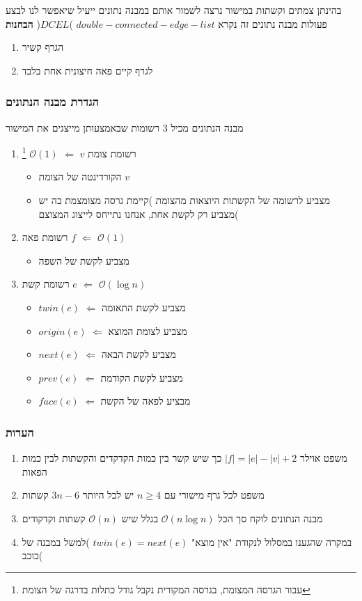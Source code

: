 \documentclass{article}
\makeatletter
\newcommand*{\saved@uline}{}
\let\saved@uline\uline
\newcommand*{\mathuline}{%
  \mathpalette{\math@uline\saved@uline}%
}
\newcommand*{\math@uline}[3]{%
  \mbox{#1{$#2#3\m@th$}}%
}
\renewcommand*{\uline}{%
  \relax  
  \ifmmode
    \expandafter\mathuline
  \else
    \expandafter\saved@uline
  \fi
}
\makeatother
\begin{document}
\noindent בהינתן צמתים וקשתות במישור נרצה לשמור אותם במבנה נתונים ייעיל שיאפשר לנו לבצע  פעולות מבנה נתונים זה נקרא $double-connected-edge-list$ )$DCEL$( 
\newline\noindent\textbf{הבחנות}
\begin{enumerate}
\item הגרף קשיר
\item לגרף קיים פאה חיצונית אחת בלבד
\end{enumerate}
\subsubsection{הגדרת מבנה הנתונים}
\noindent מבנה הנתונים מכיל 3 רשומות שבאמצעותן מייצגים את המישור
\begin{enumerate}
\item \uline{רשומת צומת $v$} $\Leftarrow$ $\mathcal{O}{(1)}$ \footnote{עבור הגרסה המצומת, בגרסה המקורית נקבל גודל כתלות בדרגה של הצומת}
\begin{itemize}
\item הקורדינטה של הצומת $v$
\item מצביע לרשומה של הקשתות היוצאות מהצומת )קיימת גרסה מצומצמת בה יש מצביע רק לקשת אחת, אנחנו נתייחס לייצוג המצוצם(
\end{itemize}
\item \uline{רשומת פאה $f$} $\Leftarrow$ $\mathcal{O}{(1)}$
\begin{itemize}
\item מצביע לקשת של השפה
\end{itemize}
\item \uline{רשומת קשת $e$} $\Leftarrow$ $\mathcal{O}{(\log n)}$
\begin{itemize}
\item $twin(e)$ $\Leftarrow$ מצביע לקשת התאומה  
\item $origin(e)$ $\Leftarrow$ מצביע לצומת המוצא  
\item $next(e)$ $\Leftarrow$ מצביע לקשת הבאה  
\item $prev(e)$ $\Leftarrow$ מצביע לקשת הקודמת  
\item $face(e)$ $\Leftarrow$ מבציע לפאה של הקשת  
\end{itemize}
\end{enumerate}

\subsubsection{הערות}
\begin{enumerate} 
\item \uline{משפט אוילר} $|f|=|e|-|v|+2$ כך שיש קשר בין כמות הקדקדים והקשתות  לבין כמות הפאות
\item\uline{משפט} לכל גרף מישורי עם $n\geq 4$  יש לכל היותר $3n-6$ קשתות
\item מבנה הנתונים לוקח סך הכל $\mathcal{O}(n\log n)$ בגלל שיש $\mathcal{O}(n)$ קשתות וקדקודים 
\item במקרה שהגענו במסלול לנקודת "אין מוצא" $twin(e)=next(e)$ )למשל במבנה של כוכב(
\end{enumerate}
\end{document}

